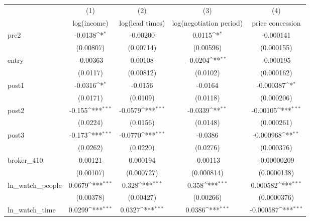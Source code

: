 {
\def\sym#1{\ifmmode^{#1}\else\(^{#1}\)\fi}
\begin{tabular}{l*{4}{c}}
\toprule
            &\multicolumn{1}{c}{(1)}&\multicolumn{1}{c}{(2)}&\multicolumn{1}{c}{(3)}&\multicolumn{1}{c}{(4)}\\
            &\multicolumn{1}{c}{log(income)}&\multicolumn{1}{c}{log(lead times)}&\multicolumn{1}{c}{log(negotiation period)}&\multicolumn{1}{c}{price concession}\\
\midrule
pre2        &     -0.0138\sym{*}  &    -0.00200         &      0.0115\sym{*}  &   -0.000141         \\
            &   (0.00807)         &   (0.00714)         &   (0.00596)         &  (0.000155)         \\
\addlinespace
entry       &    -0.00363         &     0.00108         &     -0.0204\sym{**} &   -0.000195         \\
            &    (0.0117)         &   (0.00812)         &    (0.0102)         &  (0.000162)         \\
\addlinespace
post1       &     -0.0316\sym{*}  &     -0.0156         &     -0.0164         &   -0.000387\sym{*}  \\
            &    (0.0171)         &    (0.0109)         &    (0.0118)         &  (0.000206)         \\
\addlinespace
post2       &      -0.155\sym{***}&     -0.0579\sym{***}&     -0.0339\sym{**} &    -0.00105\sym{***}\\
            &    (0.0224)         &    (0.0156)         &    (0.0148)         &  (0.000261)         \\
\addlinespace
post3       &      -0.173\sym{***}&     -0.0770\sym{***}&     -0.0386         &   -0.000968\sym{**} \\
            &    (0.0262)         &    (0.0220)         &    (0.0276)         &  (0.000376)         \\
\addlinespace
broker\_410  &     0.00121         &    0.000194         &    -0.00113         & -0.00000209         \\
            &   (0.00107)         &  (0.000727)         &  (0.000814)         & (0.0000138)         \\
\addlinespace
ln\_watch\_people&      0.0679\sym{***}&       0.328\sym{***}&       0.358\sym{***}&    0.000582\sym{***}\\
            &   (0.00378)         &   (0.00427)         &   (0.00266)         & (0.0000376)         \\
\addlinespace
ln\_watch\_time&      0.0299\sym{***}&      0.0327\sym{***}&      0.0386\sym{***}&   -0.000587\sym{***}\\

\end{tabular}}
